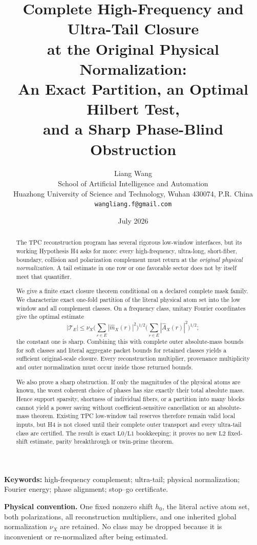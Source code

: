 \documentclass[11pt]{article}
\title{\textbf{Complete High-Frequency and Ultra-Tail Closure}\\
\textbf{at the Original Physical Normalization:}\\
An Exact Partition, an Optimal Hilbert Test,\\
and a Sharp Phase-Blind Obstruction}
\author{Liang Wang\\
School of Artificial Intelligence and Automation\\
Huazhong University of Science and Technology, Wuhan 430074, P.R. China\\
\texttt{wangliang.f@gmail.com}}
\date{July 2026}
\theoremstyle{definition}
\theoremstyle{remark}
\newcommand{\Lzero}{\mathrm{L0}}
\newcommand{\Lone}{\mathrm{L1}}
\newcommand{\Ltwo}{\mathrm{L2}}
\newcommand{\Tail}{\mathcal T}
\begin{document}
\maketitle

\begin{abstract}
The TPC reconstruction program has several rigorous low-window
interfaces, but its working Hypothesis H4 asks for more: every
high-frequency, ultra-long, short-fiber, boundary, collision and
polarization complement must return at the \emph{original physical
normalization}.  A tail estimate in one row or one favorable sector
does not by itself meet that quantifier.

We give a finite exact closure theorem conditional on a declared
complete mask family.  We characterize exact one-fold partition of
the literal physical atom set into the low window and all complement
classes.  On a frequency class, unitary Fourier
coordinates give the optimal estimate
\[
 |\Tail_E|
 \le \nu_X
 \Big(\sum_{r\in E}|\widehat m_X(r)|^2\Big)^{1/2}
 \Big(\sum_{r\in E}|\widehat A_X(r)|^2\Big)^{1/2};
\]
the constant one is sharp.  Combining this with complete outer
absolute-mass bounds for soft classes and literal aggregate packet
bounds for retained classes yields a sufficient original-scale
closure.  Every reconstruction multiplier, provenance multiplicity
and outer normalization must occur inside those returned bounds.

We also prove a sharp obstruction.  If only the magnitudes of the
physical atoms are known, the worst coherent choice of phases has
size exactly their total absolute mass.  Hence support sparsity,
shortness of individual fibers, or a partition into many blocks
cannot yield a power saving without coefficient-sensitive
cancellation or an absolute-mass theorem.  Existing TPC low-window
tail reserves therefore remain valid local inputs, but H4 is not
closed until their complete outer transport and every ultra-tail
class are certified.  The result is exact \(\Lzero/\Lone\)
bookkeeping; it proves no new \(\Ltwo\) fixed-shift estimate, parity
breakthrough or twin-prime theorem.
\end{abstract}

\noindent\textbf{Keywords:}
high-frequency complement; ultra-tail; physical normalization;
Fourier energy; phase alignment; stop--go certificate.

\medskip
\noindent\textbf{Physical convention.}
One fixed nonzero shift \(h_0\), the literal active atom set, both
polarizations, all reconstruction multipliers, and one inherited
global normalization \(\nu_X\) are retained.  No class may be
dropped because it is inconvenient or re-normalized after being
estimated.
\end{document}
